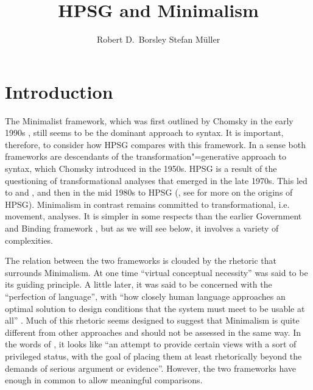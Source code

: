 \documentclass[output=paper]{langsci/langscibook}
\author{%
	Robert D.\ Borsley\affiliation{University of Essex}%
	\lastand Stefan Müller\affiliation{Humboldt-Universität zu Berlin}%
}
\title{HPSG and Minimalism}
\begin{document}
\label{chap-minimalism}

\section{Introduction}
\label{sec:min-intro}


The Minimalist framework, which was first outlined by Chomsky in the early 1990s
\citep{Chomsky93b-u,Chomsky95a-u}, still seems to be the dominant approach to syntax. It is
important, therefore, to consider how HPSG compares with this framework. In a sense both frameworks
are descendants of the transformation"=generative approach to syntax, which Chomsky introduced in the
1950s. HPSG is a result of the questioning of transformational analyses that emerged in the late
1970s. This led to  \citep{BK82a} and  \citep{GKPS85a}, and then in
the mid 1980s to HPSG (\citealt{ps}, see  for more on the origins of HPSG). Minimalism in contrast
remains committed to transformational, i.e. movement, analyses. It is simpler in some respects than
the earlier Government and Binding framework \citep{Chomsky81a}, but as we will see below, it involves a variety of
complexities. 

The relation between the two frameworks is clouded by the rhetoric that surrounds Minimalism. At one
time ``virtual conceptual necessity'' was said to be its guiding principle. A little later, it was
said to be concerned with the ``perfection of language'', with ``how closely human language approaches
an optimal solution to design conditions that the system must meet to be usable at all''
\citep[58]{Chomsky2002a-u}. Much of this rhetoric seems designed to suggest that Minimalism is quite
different from other approaches and should not be assessed in the same way. In the words of \citet[]{Postal2003a}, it
looks like ``an attempt to provide certain views with a sort of privileged status, with the goal of
placing them at least rhetorically beyond the demands of serious argument or evidence''. However, the
two frameworks have enough in common to allow meaningful comparisons.  
\end{document}
